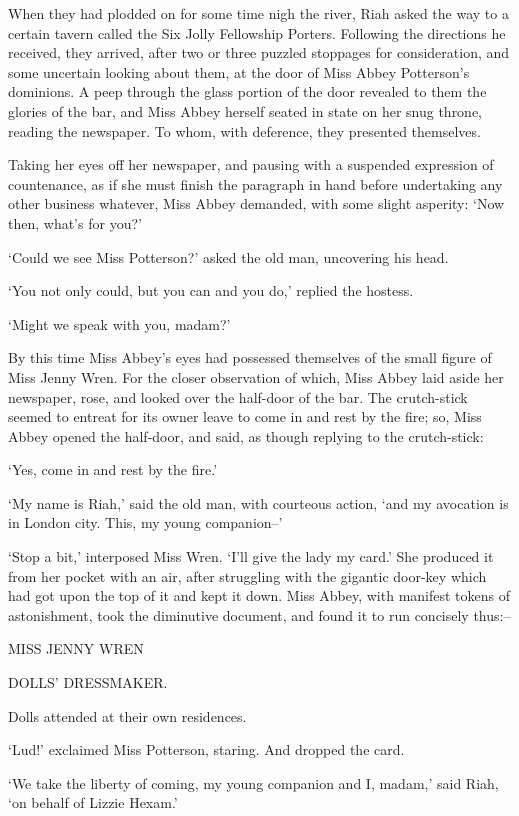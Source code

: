 When they had plodded on for some time nigh the river, Riah asked
the way to a certain tavern called the Six Jolly Fellowship Porters.
Following the directions he received, they arrived, after two or three
puzzled stoppages for consideration, and some uncertain looking about
them, at the door of Miss Abbey Potterson’s dominions. A peep through
the glass portion of the door revealed to them the glories of the bar,
and Miss Abbey herself seated in state on her snug throne, reading the
newspaper. To whom, with deference, they presented themselves.

Taking her eyes off her newspaper, and pausing with a suspended
expression of countenance, as if she must finish the paragraph in hand
before undertaking any other business whatever, Miss Abbey demanded,
with some slight asperity: ‘Now then, what’s for you?’

‘Could we see Miss Potterson?’ asked the old man, uncovering his head.

‘You not only could, but you can and you do,’ replied the hostess.

‘Might we speak with you, madam?’

By this time Miss Abbey’s eyes had possessed themselves of the small
figure of Miss Jenny Wren. For the closer observation of which, Miss
Abbey laid aside her newspaper, rose, and looked over the half-door of
the bar. The crutch-stick seemed to entreat for its owner leave to come
in and rest by the fire; so, Miss Abbey opened the half-door, and said,
as though replying to the crutch-stick:

‘Yes, come in and rest by the fire.’

‘My name is Riah,’ said the old man, with courteous action, ‘and my
avocation is in London city. This, my young companion--’

‘Stop a bit,’ interposed Miss Wren. ‘I’ll give the lady my card.’ She
produced it from her pocket with an air, after struggling with the
gigantic door-key which had got upon the top of it and kept it down.
Miss Abbey, with manifest tokens of astonishment, took the diminutive
document, and found it to run concisely thus:--


		MISS JENNY WREN

	       DOLLS’ DRESSMAKER.

	Dolls attended at their own residences.


‘Lud!’ exclaimed Miss Potterson, staring. And dropped the card.

‘We take the liberty of coming, my young companion and I, madam,’ said
Riah, ‘on behalf of Lizzie Hexam.’

